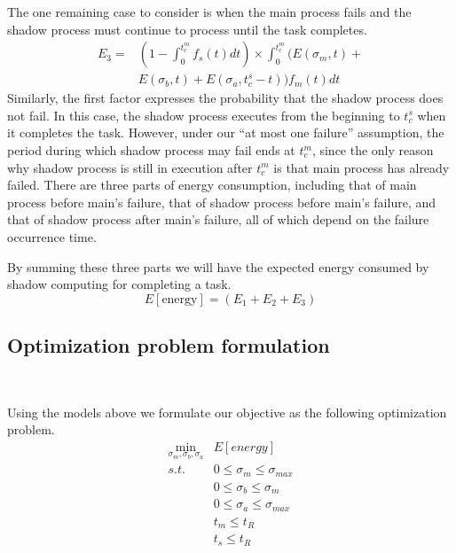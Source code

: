 The one remaining case to consider is when the main process fails and
the shadow process must continue to process until the task completes.
\begin{equation}
\begin{split}
E_3 = & (1-\int_0^{t_c^m}f_s(t)dt) \times \int_0^{t_c^m}(E(\sigma_m,t)+\\
      & E(\sigma_b,t)+E(\sigma_a,t_c^s-t))f_m(t)dt
\label{eq:energy_main_fail}
\end{split}
\end{equation}
Similarly, the first factor expresses the probability that the shadow process does
not fail. In this case, the shadow process executes from the beginning to
$t_c^s$ when it completes the task. However, under our ``at most one
failure'' assumption, the period during which shadow process may fail
ends at $t_c^m$, since the only reason why shadow process is still in
execution after $t_c^m$ is that main process has already failed. There
are three parts of energy consumption, including that of main process
before main's failure, that of shadow process before main's failure,
and that of shadow process after main's failure, all of which depend
on the failure occurrence time. 

By summing these three parts we will have
the expected energy consumed by shadow computing for completing a
task.
\begin{equation}
E[\text{energy}]= (E_1 + E_2 + E_3)
\label{eq:total_energy}
\end{equation}

\subsection{Optimization problem formulation}\

Using the models above we formulate our objective as the following
optimization problem.
\begin{equation}
\label{optimization_problem}
\begin{alignedat}{2}
\min_{\sigma_m,\sigma_b,\sigma_a}     & E[energy] \\
	s.t.							 & 0 \leq \sigma_m \leq \sigma_{max} \\
                                     & 0 \leq \sigma_b \leq \sigma_{m} \\
                                     & 0 \leq \sigma_a \leq \sigma_{max} \\
									 & t_m \leq t_R \\
									 & t_s \leq t_R	                                  
\end{alignedat}
\end{equation}

